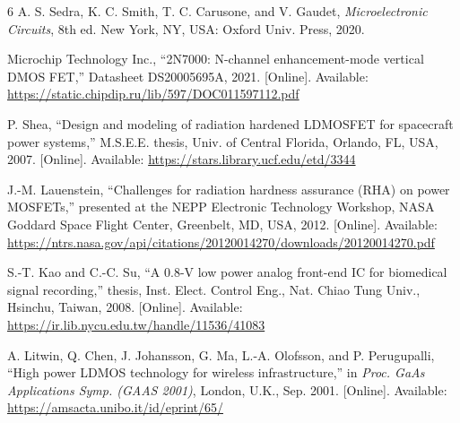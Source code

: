 \documentclass[conference]{IEEEtran}
\begin{document}
\begin{thebibliography}{6}
 A. S. Sedra, K. C. Smith, T. C. Carusone, and V. Gaudet, \emph{Microelectronic Circuits}, 8th ed. New York, NY, USA: Oxford Univ. Press, 2020.

 Microchip Technology Inc., ``2N7000: N-channel enhancement-mode vertical DMOS FET,'' Datasheet DS20005695A, 2021. [Online]. Available: \url{https://static.chipdip.ru/lib/597/DOC011597112.pdf}

 P. Shea, ``Design and modeling of radiation hardened LDMOSFET for spacecraft power systems,'' M.S.E.E. thesis, Univ. of Central Florida, Orlando, FL, USA, 2007. [Online]. Available: \url{https://stars.library.ucf.edu/etd/3344}

 J.-M. Lauenstein, ``Challenges for radiation hardness assurance (RHA) on power MOSFETs,'' presented at the NEPP Electronic Technology Workshop, NASA Goddard Space Flight Center, Greenbelt, MD, USA, 2012. [Online]. Available: \url{https://ntrs.nasa.gov/api/citations/20120014270/downloads/20120014270.pdf}

 S.-T. Kao and C.-C. Su, ``A 0.8-V low power analog front-end IC for biomedical signal recording,'' thesis, Inst. Elect. Control Eng., Nat. Chiao Tung Univ., Hsinchu, Taiwan, 2008. [Online]. Available: \url{https://ir.lib.nycu.edu.tw/handle/11536/41083}

 A. Litwin, Q. Chen, J. Johansson, G. Ma, L.-A. Olofsson, and P. Perugupalli, ``High power LDMOS technology for wireless infrastructure,'' in \emph{Proc. GaAs Applications Symp. (GAAS 2001)}, London, U.K., Sep. 2001. [Online]. Available: \url{https://amsacta.unibo.it/id/eprint/65/}
\end{thebibliography}
\end{document}

